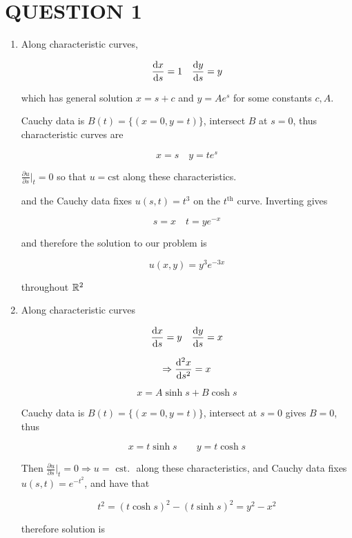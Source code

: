 \documentclass[a4paper]{article}
\begin{document}
	
\maketitle

\section{QUESTION 1}
\begin{enumerate}
	\item Along characteristic curves,
	
	\[ \frac{\mathrm{d} x}{\mathrm{d} s} = 1 \quad \frac{\mathrm{d} y}{\mathrm{d} s} = y  \]
	
	which has general solution $ x = s + c $ and $ y = Ae^{s} $ for some constants $ c,A $. 
	
	Cauchy data is $ B(t) = \{ (x = 0, y = t) \} $, intersect $ B $ at $ s = 0 $, thus characteristic curves are
	
	\[ x = s \quad y = t e^{s} \]
	
	$ \frac{\partial u}{\partial s} \big|_{t} = 0 $ so that $ u = \text{cst} $ along these characteristics.
	
	 and the Cauchy data fixes $ u(s,t) = t^{3} $ on the $ t^{\text{th}} $ curve. Inverting gives
	
	\[ s = x \quad t = y e^{-x} \]
	
	and therefore the solution to our problem is 
	
	\[ u(x,y) = y^{3} e^{-3x} \]
	
	throughout $ \mathbb{R}^{2} $
	
	\item Along characteristic curves
	
	\[ \frac{\mathrm{d} x}{\mathrm{d} s} = y \quad \frac{\mathrm{d} y}{\mathrm{d} s} = x  \]
	
	\[ \Rightarrow \frac{\mathrm{d}^{2} x }{\mathrm{d} s^{2}} = x \]
	
	\[ x = A \sinh s + B \cosh s \]
	
	Cauchy data is $ B(t) = \{ (x = 0, y = t) \} $, intersect at $ s = 0 $ gives $ B = 0 $, thus
	
	\[ x = t \sinh s \qquad y = t \cosh s \]
	
	Then $ \frac{\partial u }{\partial s} \Big|_{t} = 0  \Rightarrow u = \text{ cst. }$ along these characteristics, and Cauchy data fixes $ u(s,t) = e^{-t^{2}} $, and have that
	
	\[ t^{2} = (t \cosh s)^{2} - (t \sinh s)^{2} = y^{2} - x^{2} \]
	
	therefore solution is
	

\end{enumerate}
\end{document}
